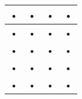 \begin{tabular}{||c|c|c|c||}
\hline 
• & • & • & • \\ 
\hline 
• & • & • & • \\ 
\hline 
• & • & • & • \\ 
\hline 
• & • & • & • \\ 
\hline 
• & • & • & • \\ 
\hline 
\end{tabular} 